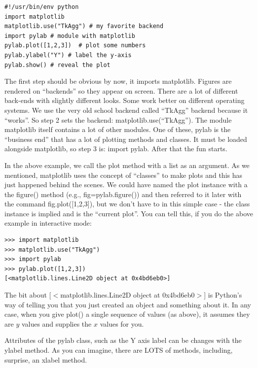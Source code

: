 \documentclass[11pt]{book}
\begin{document}
{{{{{ \color{blue} \begin{verbatim}
#!/usr/bin/env python
import matplotlib
matplotlib.use("TkAgg") # my favorite backend
import pylab # module with matplotlib
pylab.plot([1,2,3])  # plot some numbers
pylab.ylabel("Y") # label the y-axis
pylab.show() # reveal the plot
\end{verbatim}}

The first step should be obvious by now, it imports {\color{blue}matplotlib}.
Figures are rendered on ``backends'' so they appear on screen.  There are a lot of different back-ends with slightly different looks.  Some work better on different operating systems. We use the very old school backend called  ``TkAgg'' backend because it ``works''.  So step 2  sets the backend: {\color{blue}matplotlib.use(``TkAgg'')}.  The module {\color{blue}matplotlib} itself contains a lot of other modules.  One of these,
{\color{blue}pylab} is the ``business end'' that has a lot of plotting methods and classes.  It must be  loaded alongside {\color{blue}matplotlib},   so step 3 is:  {\color{blue}import pylab}. After that the fun starts.

In the above example, we call the {\color{blue}plot} method with a list as an argument.  As we mentioned, {\color{blue}matplotlib} uses the concept of ``classes'' to make plots and this has just happened behind the scenes. We could have named the plot instance with a the {\color{blue}figure()} method (e.g.,  {\color{blue}fig=pylab.figure()}) and then referred to it later with the command  {\color{blue}fig.plot([1,2,3])}, but we don't have to in this simple case - the class instance is implied and is the ``current plot''.  You can tell this, if you do the above example in interactive mode:

{ \color{blue}\begin{verbatim}
>>> import matplotlib
>>> matplotlib.use("TkAgg")
>>> import pylab
>>> pylab.plot([1,2,3])
[<matplotlib.lines.Line2D object at 0x4bd6eb0>]
\end{verbatim}}
\noindent The bit about {\color{blue}[$<$matplotlib.lines.Line2D object at 0x4bd6eb0$>$]} is Python's way of telling you that you just created an object and something about it.
In any case, when you give {\color{blue} plot()} a single sequence of values (as above), it assumes they are $y$ values and supplies the $x$ values for you.

Attributes of the {\color{blue}pylab} class, such as the Y axis label can be changes with the {\color{blue}ylabel} method.  As you can imagine, there are LOTS of methods, including, surprise, an {\color{blue}xlabel} method.

}}}}
\end{document}
